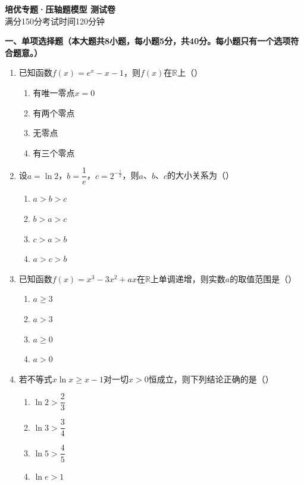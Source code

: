 \documentclass[12pt, a4paper]{ctexart}
\begin{document}
\begin{center}
{\Large\bfseries 培优专题·压轴题模型 测试卷}\\[0.5em]
{\normalsize 满分150分\quad 考试时间120分钟}
\end{center}

\vspace{0.5em}

\noindent\textbf{一、单项选择题（本大题共8小题，每小题5分，共40分。每小题只有一个选项符合题意。）}

\begin{enumerate}[label=\Alph*.]

\item 已知函数$f(x)=e^x-x-1$，则$f(x)$在$\mathbb{R}$上（\quad）
\begin{enumerate}[label=]
\item 有唯一零点$x=0$ \qquad \item 有两个零点
\item 无零点 \qquad \item 有三个零点
\end{enumerate}

\item 设$a=\ln 2$，$b=\dfrac{1}{e}$，$c=2^{-\frac{1}{2}}$，则$a$、$b$、$c$的大小关系为（\quad）
\begin{enumerate}[label=]
\item $a>b>c$ \qquad \item $b>a>c$ \qquad \item $c>a>b$ \qquad \item $a>c>b$
\end{enumerate}

\item 已知函数$f(x)=x^3-3x^2+ax$在$\mathbb{R}$上单调递增，则实数$a$的取值范围是（\quad）
\begin{enumerate}[label=]
\item $a\geq 3$ \qquad \item $a>3$ \qquad \item $a\geq 0$ \qquad \item $a>0$
\end{enumerate}

\item 若不等式$x\ln x\geq x-1$对一切$x>0$恒成立，则下列结论正确的是（\quad）
\begin{enumerate}[label=]
\item $\ln 2>\dfrac{2}{3}$ \qquad \item $\ln 3>\dfrac{3}{4}$ \qquad \item $\ln 5>\dfrac{4}{5}$ \qquad \item $\ln e>1$
\end{enumerate}


\end{enumerate}
\end{document}
